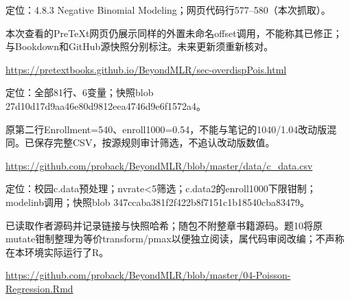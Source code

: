 \par\noindent\begin{minipage}{\linewidth}\raggedright{}\label{src:G7-CAMPUS-PRETEXT}
\par
定位：4.8.3 Negative Binomial Modeling；网页代码行577–580（本次抓取）。\par
本次查看的PreTeXt网页仍展示同样的外置未命名offset调用，不能称其已修正；与Bookdown和GitHub源快照分别标注。未来更新须重新核对。\par
{\small \url{https://pretextbooks.github.io/BeyondMLR/sec-overdispPois.html}}\par
\end{minipage}\par\medskip

\par\noindent\begin{minipage}{\linewidth}\raggedright{}\label{src:G7-CAMPUS-DATA}
\par
定位：全部81行、6变量；快照blob 27d10d17d9aa46e80d9812eea4746d9e6f1572a4。\par
原第二行Enrollment=540、enroll1000=0.54，不能与笔记的1040/1.04改动版混同。已保存完整CSV，按源规则审计筛选，不追认改动版数值。\par
{\small \url{https://github.com/proback/BeyondMLR/blob/master/data/c_data.csv}}\par
\end{minipage}\par\medskip

\par\noindent\begin{minipage}{\linewidth}\raggedright{}\label{src:G7-CAMPUS-SOURCE}
\par
定位：校园c.data预处理；nvrate<5筛选；c.data2的enroll1000下限钳制；modelinb调用；快照blob 347ccaba381f2f422b8f7151c1b18540cba83479。\par
已读取作者源码并记录链接与快照哈希；随包不附整章书籍源码。题10将原mutate钳制整理为等价transform/pmax以便独立阅读，属代码审阅改编；不声称在本环境实际运行了R。\par
{\small \url{https://github.com/proback/BeyondMLR/blob/master/04-Poisson-Regression.Rmd}}\par
\end{minipage}\par\medskip

